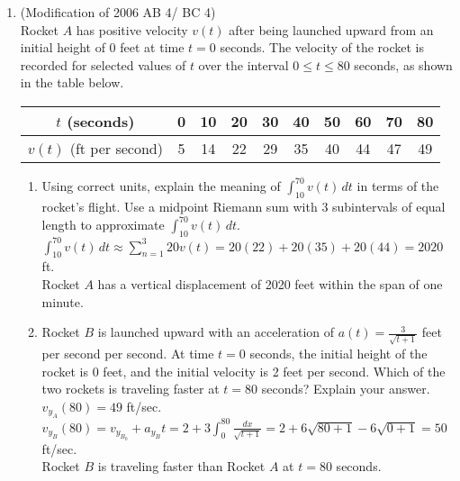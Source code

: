 \documentclass[10pt, letterpaper]{report}
\begin{document}
\begin{enumerate}
\begin{enumerate}
      $\int_{0}^{8}{T'(x)\,dx}=T(8)-T(0)=55-100=-45$ \degree C \\

      The temperature difference of the heated end of the wire to the other end is 45\degree C. \\

  \end{enumerate}
  \hline
  \item{(Modification of 2006 AB 4/ BC 4) \\
  Rocket $A$ has positive velocity $v(t)$ after being launched upward from an initial height of 0 feet at time $t=0$ seconds. The velocity of the rocket is recorded for selected values of $t$ over the interval $0\leq t \leq 80$ seconds, as shown in the table below.
  \begin{center}
    \begin{tabular}{| c | c | c | c | c | c | c | c | c | c |}
      \hline
      $t$ (seconds) & 0 & 10 & 20 & 30 & 40 & 50 & 60 & 70 & 80 \\
      \hline
      $v(t)$ (ft per second) & 5 & 14 & 22 & 29 & 35 & 40 & 44 & 47 & 49 \\
      \hline
    \end{tabular}
  \end{center}}
  \begin{enumerate}
    \item{Using correct units, explain the meaning of $\int_{10}^{70}{v(t)}\,dt$ in terms of the rocket's flight. Use a midpoint Riemann sum with 3 subintervals of equal length to approximate $\int_{10}^{70}{v(t)}\,dt$.} \\

      $\int_{10}^{70}{v(t)}\,dt\approx\sum_{n=1}^{3}{20v(t)}=20(22)+20(35)+20(44)=2020$ ft. \\

      Rocket $A$ has a vertical displacement of 2020 feet within the span of one minute. \\

    \item{Rocket $B$ is launched upward with an acceleration of $a(t)=\frac{3}{\sqrt{t+1}}$ feet per second per second. At time $t=0$ seconds, the initial height of the rocket is 0 feet, and the initial velocity is 2 feet per second. Which of the two rockets is traveling faster at $t=80$ seconds? Explain your answer.} \\

      $v_{y_{A}}(80)=49$ ft/sec. \\

      $v_{y_{B}}(80)=v_{y_{B_{0}}}+a_{y_{B}}t=
      2+3\int_{0}^{80}{\frac{dx}{\sqrt{t+1}}}=
      2+6\sqrt{80+1}-6\sqrt{0+1}=50$ ft/sec. \\

      Rocket $B$ is traveling faster than Rocket $A$ at $t=80$ seconds. 

  \end{enumerate}
\end{enumerate}
\end{document}
